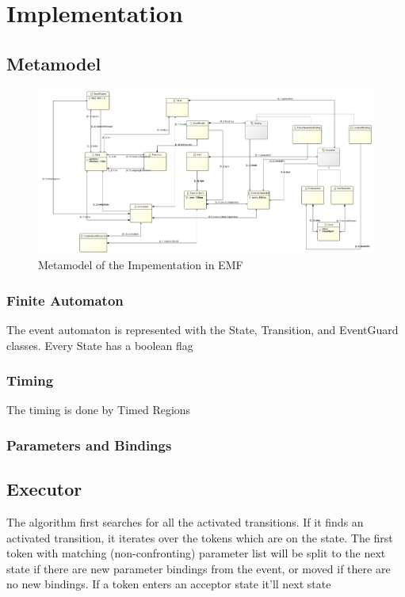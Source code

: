 				
				
	\section{Implementation}
		\subsection{Metamodel}
		
			\begin{figure}[h]
			\centering
			\includegraphics[width=0.9\linewidth]{include/figures/chapter_5/model}
			\caption{Metamodel of the Impementation in EMF}
			\label{fig:cep:model}
			\end{figure}
		
			\subsubsection{Finite Automaton}
				The event automaton is represented with the State, Transition, and EventGuard classes.
				Every State has a boolean flag 
			\subsubsection{Timing}
				The timing is done by Timed Regions
			\subsubsection{Parameters and Bindings}
			
		
		\subsection{Executor}
			The algorithm first searches for all the activated transitions.
			If it finds an activated transition, it iterates over the tokens which are on the state. The first token with matching (non-confronting)
			parameter list will be split to the next state if there are new parameter bindings from the event, or moved if there are no new bindings.
			If a token enters an acceptor state it'll 
			next state 
